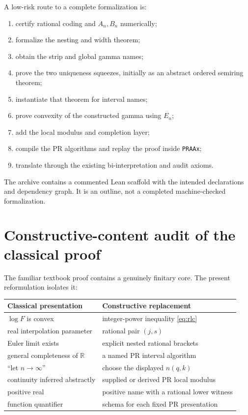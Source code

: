 \documentclass[11pt]{article}
\newcommand{\R}{\mathbb R}
\newcommand{\code}[1]{\texttt{#1}}
\begin{document}
A low-risk route to a complete formalization is:
\begin{enumerate}
\item certify rational coding and $A_n,B_n$ numerically;
\item formalize the nesting and width theorem;
\item obtain the strip and global gamma names;
\item prove the two uniqueness squeezes, initially as an abstract ordered
semiring theorem;
\item instantiate that theorem for interval names;
\item prove convexity of the constructed gamma using $E_n$;
\item add the local modulus and completion layer;
\item compile the PR algorithms and replay the proof inside \code{PRAAx};
\item translate through the existing bi-interpretation and audit axioms.
\end{enumerate}
The archive contains a commented Lean scaffold with the intended declarations
and dependency graph.  It is an outline, not a completed machine-checked
formalization.

\section{Constructive-content audit of the classical proof}

The familiar textbook proof contains a genuinely finitary core.  The present
reformulation isolates it:

\begin{center}
\begin{tabular}{ll}
\toprule
Classical presentation & Constructive replacement \\
\midrule
$\log F$ is convex & integer-power inequality \eqref{eq:rlc} \\
real interpolation parameter & rational pair $(j,s)$ \\
Euler limit exists & explicit nested rational brackets \\
general completeness of $\R$ & a named PR interval algorithm \\
``let $n\to\infty$'' & choose the displayed $n(q,k)$ \\
continuity inferred abstractly & supplied or derived PR local modulus \\
positive real & positive name with a rational lower witness \\
function quantifier & schema for each fixed PR presentation \\
\bottomrule
\end{tabular}
\end{center}
\end{document}
